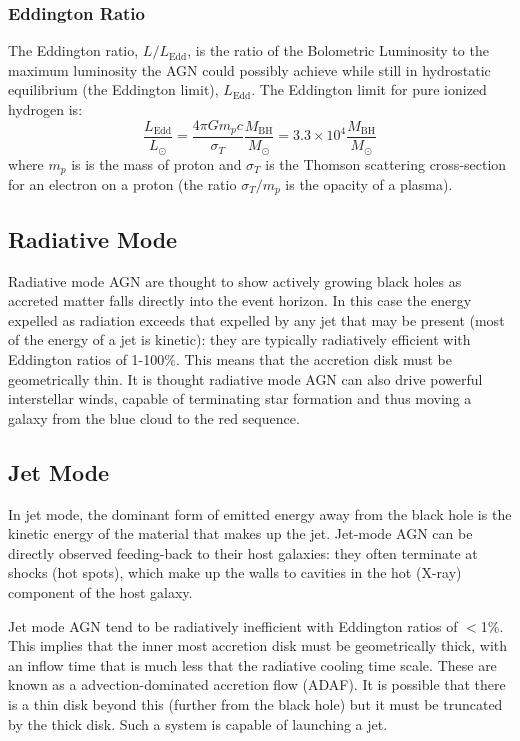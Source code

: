 		\subsubsection{Eddington Ratio}
			The Eddington ratio, $L/L_\mathrm{Edd}$, is the ratio of the Bolometric Luminosity to the maximum luminosity the AGN could possibly achieve while still in hydrostatic equilibrium (the Eddington limit), $L_\mathrm{Edd}$. The Eddington limit for pure ionized hydrogen is:
			\begin{equation}
				\frac{L_\mathrm{Edd}}{L_\odot} = \frac{4 \pi G m_p c}{\sigma_T}	\frac{M_\mathrm{BH}}{M_\odot} = 3.3 \times 10^4 \frac{M_\mathrm{BH}}{M_\odot}
			\end{equation}
			where $m_p$ is is the mass of proton and $\sigma_T$ is the Thomson scattering cross-section for an electron on a proton (the ratio $\sigma_T/m_p$ is the opacity of a plasma). 

	\subsection{Radiative Mode}
		\label{subsec:introRadiative}
		Radiative mode AGN are thought to show actively growing black holes as accreted matter falls directly into the event horizon. In this case the energy expelled as radiation exceeds that expelled by any jet that may be present (most of the energy of a jet is kinetic): they are typically radiatively efficient with Eddington ratios of 1-100\%. This means that the accretion disk must be geometrically thin. It is thought radiative mode AGN can also drive powerful interstellar winds, capable of terminating star formation and thus moving a galaxy from the blue cloud to the red sequence. 

	\subsection{Jet Mode}
		\label{subsec:introJet}
		In jet mode, the dominant form of emitted energy away from the black hole is the kinetic energy of the material that makes up the jet. Jet-mode AGN can be directly observed feeding-back to their host galaxies: they often terminate at shocks (hot spots), which make up the walls to cavities in the hot (X-ray) component of the host galaxy.

		Jet mode AGN tend to be radiatively inefficient with Eddington ratios of $<$1\%. This implies that the inner most accretion disk must be geometrically thick, with an inflow time that is much less that the radiative cooling time scale. These are known as a advection-dominated accretion flow (ADAF). It is possible that there is a thin disk beyond this (further from the black hole) but it must be truncated by the thick disk. Such a system is capable of launching a jet. 

